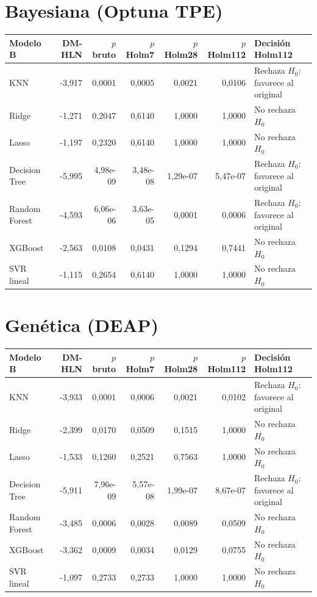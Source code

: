 \documentclass[10pt]{article}
\begin{document}
\section*{Bayesiana (Optuna TPE)}
\begin{center}\small\begin{tabular}{lrrrrrl}\toprule
Modelo B & DM-HLN & $p$ bruto & $p$ Holm7 & $p$ Holm28 & $p$ Holm112 & Decisión Holm112\\\midrule
KNN & -3,917 & 0,0001 & 0,0005 & 0,0021 & 0,0106 & Rechaza $H_0$: favorece al original\\
Ridge & -1,271 & 0,2047 & 0,6140 & 1,0000 & 1,0000 & No rechaza $H_0$\\
Lasso & -1,197 & 0,2320 & 0,6140 & 1,0000 & 1,0000 & No rechaza $H_0$\\
Decision Tree & -5,995 & 4,98e-09 & 3,48e-08 & 1,29e-07 & 5,47e-07 & Rechaza $H_0$: favorece al original\\
Random Forest & -4,593 & 6,06e-06 & 3,63e-05 & 0,0001 & 0,0006 & Rechaza $H_0$: favorece al original\\
XGBoost & -2,563 & 0,0108 & 0,0431 & 0,1294 & 0,7441 & No rechaza $H_0$\\
SVR lineal & -1,115 & 0,2654 & 0,6140 & 1,0000 & 1,0000 & No rechaza $H_0$\\
\bottomrule\end{tabular}\end{center}
\section*{Genética (DEAP)}
\begin{center}\small\begin{tabular}{lrrrrrl}\toprule
Modelo B & DM-HLN & $p$ bruto & $p$ Holm7 & $p$ Holm28 & $p$ Holm112 & Decisión Holm112\\\midrule
KNN & -3,933 & 0,0001 & 0,0006 & 0,0021 & 0,0102 & Rechaza $H_0$: favorece al original\\
Ridge & -2,399 & 0,0170 & 0,0509 & 0,1515 & 1,0000 & No rechaza $H_0$\\
Lasso & -1,533 & 0,1260 & 0,2521 & 0,7563 & 1,0000 & No rechaza $H_0$\\
Decision Tree & -5,911 & 7,96e-09 & 5,57e-08 & 1,99e-07 & 8,67e-07 & Rechaza $H_0$: favorece al original\\
Random Forest & -3,485 & 0,0006 & 0,0028 & 0,0089 & 0,0509 & No rechaza $H_0$\\
XGBoost & -3,362 & 0,0009 & 0,0034 & 0,0129 & 0,0755 & No rechaza $H_0$\\
SVR lineal & -1,097 & 0,2733 & 0,2733 & 1,0000 & 1,0000 & No rechaza $H_0$\\
\bottomrule\end{tabular}\end{center}
\end{document}
